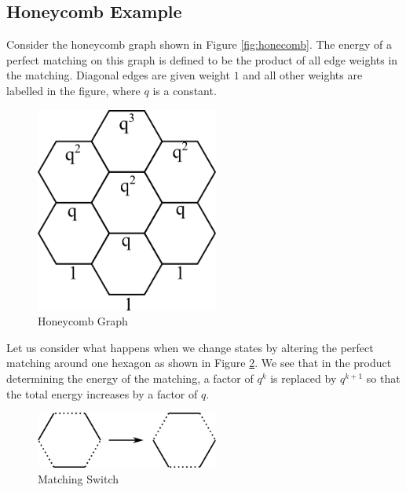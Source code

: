 \documentclass{article}
\begin{document}
\subsection{Honeycomb Example}

\hspace{1cm} Consider the honeycomb graph shown in Figure \ref{fig:honecomb}. The energy of a perfect matching on this graph is defined to be the product of all edge weights in the matching. Diagonal edges are given weight $1$ and all other weights are labelled in the figure, where $q$ is a constant. 
\begin{figure}[htb!]
	\begin{center}
 	\includegraphics[width=6cm]{honeycomb.png}
  	\caption{Honeycomb Graph}
	 \label{fig:honeycomb}
 	 \end{center}
\end{figure} 
	
	
Let us consider what happens when we change states by altering the perfect matching around one hexagon as shown in Figure \ref{fig:honey_switch}. We see that in the product determining the energy of the matching, a factor of $q^{k}$ is replaced by $q^{k+1}$ so that the total energy increases by a factor of $q$. 
\begin{figure}[htb!]
	\begin{center}
 	\includegraphics[width=6cm]{honey_switch.png}
  	\caption{Matching Switch}
	 \label{fig:honey_switch}
 	 \end{center}
\end{figure} 
	
\end{document}

